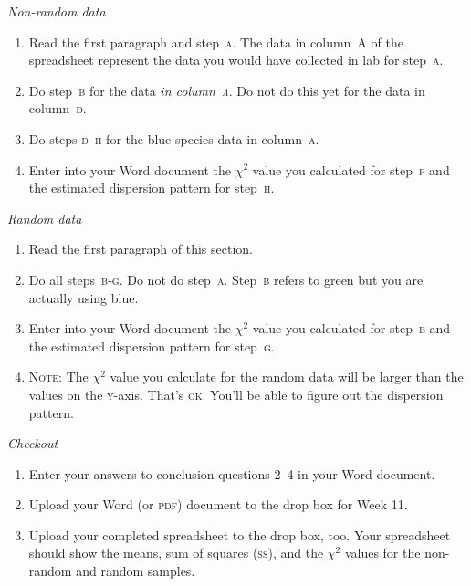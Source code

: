 \documentclass[12pt]{exam}
\begin{document}
\bigskip

\emph{Non-random data}

\begin{enumerate}[resume]

\item Read the first paragraph and step~\textsc{a.} The data in column~A of the spreadsheet represent the data you would have collected in lab for step~\textsc{a.}

\item Do step~\textsc{b} for the data \emph{in column~\textsc{a.}} Do not do this yet for the data in column~\textsc{d.}

\item Do steps \textsc{d–h} for the blue species data in column~\textsc{a.} 

\item Enter into your Word document the $\chi^2$ value you calculated for step~\textsc{f} and the estimated dispersion pattern for step~\textsc{h.}

\end{enumerate}

\newpage

\emph{Random data}

\begin{enumerate}[resume]

\item Read the first paragraph of this section. 

\item Do all steps~\textsc{b-g}. Do not do step~\textsc{a.} Step~\textsc{b} refers to green but you are actually using blue.

\item Enter into your Word document the $\chi^2$ value you calculated for step~\textsc{e} and the estimated dispersion pattern for step~\textsc{g.}

\item \textsc{Note:} The $\chi^2$ value you calculate for the random data will be larger than the values on the \textsc{y}-axis. That's \textsc{ok.} You'll be able to figure out the dispersion pattern.

\end{enumerate}

\bigskip

\emph{Checkout}

\begin{enumerate}[resume]

\item Enter your answers to conclusion questions 2–4 in your Word document.

\item Upload your Word (or \textsc{pdf}) document to the drop box for Week 11. 

\item Upload your completed spreadsheet to the drop box, too. Your spreadsheet should show the means, sum of squares (\textsc{ss}), and the $\chi^2$ values for the non-random and random samples.

\end{enumerate}
\end{document}
